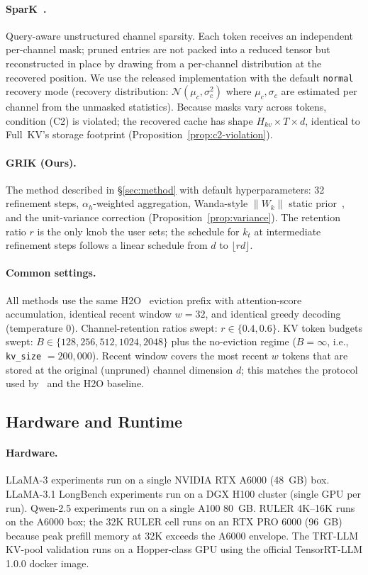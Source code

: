 \documentclass{article}
\begin{document}
\paragraph{SparK~\citep{spark}.} Query-aware unstructured channel sparsity. Each token receives an independent per-channel mask; pruned entries are not packed into a reduced tensor but reconstructed in place by drawing from a per-channel distribution at the recovered position. We use the released implementation with the default \texttt{normal} recovery mode (recovery distribution: $\mathcal{N}(\mu_c, \sigma_c^2)$ where $\mu_c, \sigma_c$ are estimated per channel from the unmasked statistics). Because masks vary across tokens, condition (C2) is violated; the recovered cache has shape $H_{kv} \times T \times d$, identical to Full~KV's storage footprint (Proposition~\ref{prop:c2-violation}).
 
\paragraph{GRIK (Ours).} The method described in \S\ref{sec:method} with default hyperparameters: 32 refinement steps, $\alpha_h$-weighted aggregation, Wanda-style $\|W_k\|$ static prior~\citep{wanda}, and the unit-variance correction (Proposition~\ref{prop:variance}). The retention ratio $r$ is the only knob the user sets; the schedule for $k_t$ at intermediate refinement steps follows a linear schedule from $d$ to $\lfloor rd \rfloor$.
 
\paragraph{Common settings.} All methods use the same H2O~\citep{h2o} eviction prefix with attention-score accumulation, identical recent window $w = 32$, and identical greedy decoding (temperature 0). Channel-retention ratios swept: $r \in \{0.4, 0.6\}$. KV token budgets swept: $B \in \{128, 256, 512, 1024, 2048\}$ plus the no-eviction regime ($B = \infty$, i.e., \texttt{kv\_size} $= 200{,}000$). Recent window covers the most recent $w$ tokens that are stored at the original (unpruned) channel dimension $d$; this matches the protocol used by~\citet{think} and the H2O baseline.
 
\subsection{Hardware and Runtime}
\label{app:expsetup-hw}
 
\paragraph{Hardware.} LLaMA-3 experiments run on a single NVIDIA RTX A6000 (48~GB) box. LLaMA-3.1 LongBench experiments run on a DGX H100 cluster (single GPU per run). Qwen-2.5 experiments run on a single A100 80~GB. RULER 4K--16K runs on the A6000 box; the 32K RULER cell runs on an RTX PRO 6000 (96~GB) because peak prefill memory at 32K exceeds the A6000 envelope. The TRT-LLM KV-pool validation runs on a Hopper-class GPU using the official TensorRT-LLM 1.0.0 docker image.
 
\end{document}
